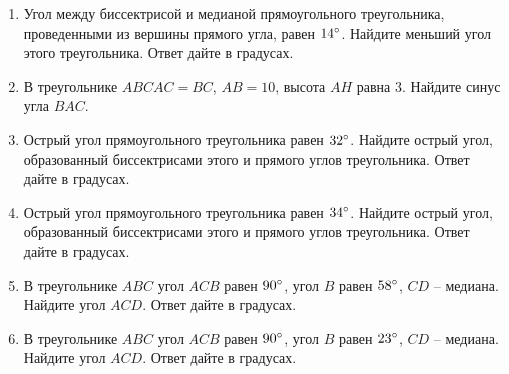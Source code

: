 \documentclass[12pt, a4paper]{article}
\begin{document}
\begin{enumerate}
		\item Угол между биссектрисой и медианой прямоугольного треугольника, проведенными из вершины прямого угла, равен \( 14\degree \). Найдите меньший угол этого треугольника. Ответ дайте в градусах.
		\item В треугольнике \( ABC AC=BC\), \(AB=10\), высота \(AH\) равна \(3\). Найдите синус угла \(BAC\).
		\item Острый угол прямоугольного треугольника равен \( 32\degree \). Найдите острый угол, образованный биссектрисами этого и прямого углов треугольника. Ответ дайте в градусах.
		\item Острый угол прямоугольного треугольника равен \( 34\degree \). Найдите острый угол, образованный биссектрисами этого и прямого углов треугольника. Ответ дайте в градусах.
		\item В треугольнике \( ABC \) угол \( ACB \) равен \( 90\degree \), угол \( B \) равен \( 58 \degree\), \( CD \) – медиана. Найдите угол \( ACD \). Ответ дайте в градусах.
		\item В треугольнике \( ABC \) угол \( ACB \) равен \( 90\degree \), угол \( B \) равен \( 23\degree \), \( CD \) – медиана. Найдите угол \( ACD \). Ответ дайте в градусах.
	\end{enumerate}	
	
\end{document}
